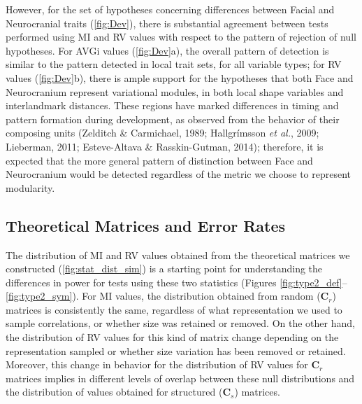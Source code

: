 \documentclass[12pt,]{article}
\begin{document}
However, for the set of hypotheses concerning differences between Facial
and Neurocranial traits (\autoref{fig:Dev}), there is substantial
agreement between tests performed using MI and RV values with respect to
the pattern of rejection of null hypotheses. For AVGi values
(\autoref{fig:Dev}a), the overall pattern of detection is similar to the
pattern detected in local trait sets, for all variable types; for RV
values (\autoref{fig:Dev}b), there is ample support for the hypotheses
that both Face and Neurocranium represent variational modules, in both
local shape variables and interlandmark distances. These regions have
marked differences in timing and pattern formation during development,
as observed from the behavior of their composing units (Zelditch \&
Carmichael, 1989; Hallgrímsson \emph{et al.}, 2009; Lieberman, 2011;
Esteve-Altava \& Rasskin-Gutman, 2014); therefore, it is expected that
the more general pattern of distinction between Face and Neurocranium
would be detected regardless of the metric we choose to represent
modularity.

\subsection{Theoretical Matrices and Error
Rates}\label{theoretical-matrices-and-error-rates}

The distribution of MI and RV values obtained from the theoretical
matrices we constructed (\autoref{fig:stat_dist_sim}) is a starting
point for understanding the differences in power for tests using these
two statistics (Figures \ref{fig:type2_def}--\ref{fig:type2_sym}). For
MI values, the distribution obtained from random ($\mathbf{C}_r$)
matrices is consistently the same, regardless of what representation we
used to sample correlations, or whether size was retained or removed. On
the other hand, the distribution of RV values for this kind of matrix
change depending on the representation sampled or whether size variation
has been removed or retained. Moreover, this change in behavior for the
distribution of RV values for $\mathbf{C}_r$ matrices implies in
different levels of overlap between these null distributions and the
distribution of values obtained for structured ($\mathbf{C}_s$)
matrices.
\end{document}
